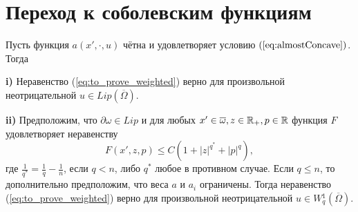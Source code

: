 \section{Переход к соболевским функциям}

\begin{thm}
\label{thm:bounded_growth}
Пусть функция $a(x', \cdot, u)$ чётна и удовлетворяет условию $(\ref{eq:almostConcave})$.
Тогда

\textbf{\textup{i)}} Неравенство (\ref{eq:to_prove_weighted}) верно для произвольной неотрицательной $u \in Lip(\overline{\Omega})$.

\textbf{\textup{ii)}} Предположим, что $\partial \omega \in Lip$ и
для любых $x' \in \overline{\omega}, z \in \Real_+, p \in \Real$
функция $F$ удовлетворяет неравенству
$$F( x', z, p ) \le C ( 1 + |z|^{q^*} + |p|^q ),$$
где $\frac{1}{q^*} = \frac{1}{q} - \frac{1}{n}$, если $q < n$, либо $q^*$ любое в противном случае.
Если $q \le n$, то дополнительно предположим, что веса $a$ и $a_i$ ограничены.
Тогда неравенство (\ref{eq:to_prove_weighted}) верно для произвольной неотрицательной $u \in W{}^1_q(\overline{\Omega})$.
\end{thm}


